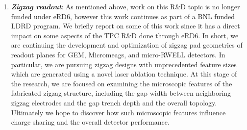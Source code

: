 \begin{enumerate}
\item	\textbf{\emph{Zigzag readout}}: As mentioned above, work on this R\&D topic is no longer funded under eRD6, however this work continues as part of a BNL funded LDRD program. We briefly report on some of this work since it has a direct impact on some aspects of the TPC R\&D done through eRD6. In short, we are continuing the development and optimization of zigzag pad geometries of readout planes for GEM, Micromeags, and micro-RWELL detectors. In particular, we are pursuing zigzag designs with unprecedented feature sizes which are generated using a novel laser ablation technique. At this stage of the research, we are focused on examining the microscopic features of the fabricated zigzag structure, including the gap width between neighboring zigzag electrodes and the gap trench depth and the overall topology. Ultimately we hope to discover how such microscopic features influence charge sharing and the overall detector performance. 



\end{enumerate}